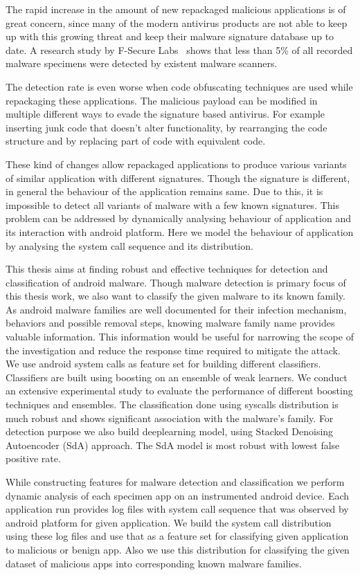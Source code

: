 The rapid increase in the amount of new repackaged malicious applications is of great concern, since many of the modern antivirus products are not able to keep up with this growing threat and keep their malware signature database up to date. A research study by F-Secure Labs~\cite{29} shows that less than 5\% of all recorded malware specimens were detected by existent malware scanners.

The detection rate is even worse when code obfuscating techniques are used while repackaging these applications. The malicious payload can be modified in multiple different ways to evade the signature based antivirus. For example inserting junk code that doesn't alter functionality, by rearranging the code structure and by replacing part of code with equivalent code. 

These kind of changes allow repackaged applications to produce various variants of similar application with different signatures. Though the signature is different, in general the behaviour of the application remains same. Due to this, it is impossible to detect all variants of malware with a few known signatures. This problem can be addressed by dynamically analysing behaviour of application and its interaction with android platform. Here we model the behaviour of application by analysing the system call sequence and its distribution. 

This thesis aims at finding robust and effective techniques for detection and classification of android malware. Though malware detection is primary focus of this thesis work, we also want to classify the given malware to its known family. As android malware families are well documented for their infection mechanism, behaviors and possible removal steps, knowing malware family name provides valuable information. This information would be useful for narrowing the scope of the investigation and reduce the response time required to mitigate the attack. We use android system calls as feature set for building different classifiers. Classifiers are built using boosting on an ensemble of weak learners. We conduct an extensive experimental study to evaluate the performance of different boosting techniques and ensembles. The classification done using syscalls distribution is much robust and shows significant association with the malware's family. For detection purpose we also build deeplearning model, using Stacked Denoising Autoencoder (SdA) approach. The SdA model is most robust with lowest false positive rate.

While constructing features for malware detection and classification we perform dynamic analysis of each specimen app on an instrumented android device. Each application run provides log files with system call sequence that was observed by android platform for given application. We build the system call distribution using these log files and use that as a feature set for classifying given application to malicious or benign app. Also we use this distribution for classifying the given dataset of malicious apps into corresponding known malware families.

